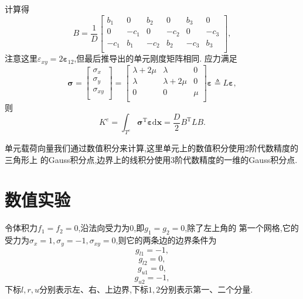 \documentclass[a4paper, 11pt]{ctexart}
\newcommand\bx{\boldsymbol{x}}
\newcommand\dd{\mathrm{d}}
\newcommand\beps{\bm{\varepsilon}}
\newcommand\bsig{\bm{\sigma}}
\begin{document}
计算得
\begin{equation}
  B=
  \dfrac{1}{D}
  \begin{bmatrix}
    b_1 & 0 & b_2 & 0 & b_3 & 0 \\
    0 & -c_1 & 0 & -c_2 & 0 & -c_3 \\
    -c_1 & b_1 & -c_2 & b_2 & -c_3 & b_3 \\
  \end{bmatrix},
\end{equation}
注意这里$\varepsilon_{xy}=2\beps_{12}$,但最后推导出的单元刚度矩阵相同.
应力满足
\begin{equation}
  \bsig=\begin{bmatrix}
    {\sigma_x} \\
    {\sigma_y} \\
    \sigma_{xy}\\
    \end{bmatrix}
    =
    \begin{bmatrix}
      \lambda+2\mu & \lambda & 0 \\
      \lambda & \lambda+2\mu & 0 \\
      0 & 0 & \mu \\
    \end{bmatrix}
    \beps
    \triangleq L\beps,
\end{equation}
则
\begin{equation}
  K^e=\int_{T^e}\bsig^{\mathrm{T}}\beps\dd\bx=\dfrac{D}{2}B^\mathrm{T}LB.
\end{equation}

单元载荷向量我们通过数值积分来计算,这里单元上的数值积分使用2阶代数精度的三角形上
的Gauss积分点,边界上的线积分使用3阶代数精度的一维的Gauss积分点.

\section{数值实验}
令体积力$f_1=f_2=0$,沿法向受力为$0$,即$g_1=g_2=0$,除了左上角的
第一个网格,它的受力为$\sigma_x=1,\sigma_y=-1,\sigma_{xy}=0$,则它的两条边的边界条件为
$$g_{l1}=-1,$$
$$g_{l2}=0,$$
$$g_{u1}=0, $$
$$g_{u2}=-1, $$
下标$l,r,u$分别表示左、右、上边界,下标$1,2$分别表示第一、二个分量.
\end{document}
